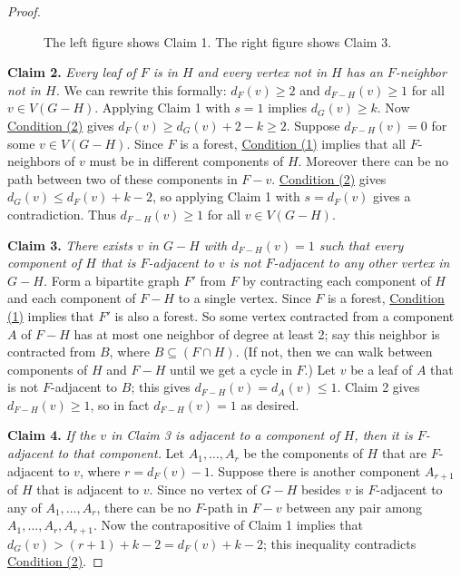 \documentclass[12pt]{article}
\theoremstyle{plain}
\theoremstyle{definition}
\theoremstyle{remark}
\newcommand{\CondOne}{\hyperref[cond1]{Condition (1)}}
\newcommand{\CondTwo}{\hyperref[cond2]{Condition (2)}}
\begin{document}
\begin{proof}
\begin{center}
\begin{figure}

\caption{The left figure shows Claim 1. The right figure 
shows Claim 3.
}
\label{lemma7-figs}
\end{figure}
\end{center}

\textbf{Claim 2.} \textit{Every leaf of $F$ is in $H$ and every vertex not in
$H$ has an $F$-neighbor not in $H$.}
We can rewrite this formally: $d_F(v) \ge 2$ and $d_{F-H}(v) \ge 1$ for all $v
\in V(G-H)$.
Applying Claim 1 with $s=1$ implies $d_G(v) \ge k$. 
Now {\CondTwo} gives $d_F(v) \ge d_G(v) + 2 - k \ge 2$. Suppose
$d_{F-H}(v) = 0$ for some $v \in V(G-H)$.   Since $F$ is a forest, {\CondOne} 
implies that all $F$-neighbors of $v$ must be in different components of $H$.
Moreover there can be no path between two of these components in $F-v$.  
{\CondTwo} gives $d_G(v)\le d_F(v)+k-2$, so
applying Claim 1 with $s = d_F(v)$ gives a contradiction.
Thus $d_{F-H}(v) \ge 1$ for all $v\in V(G-H)$.

\textbf{Claim 3.} 
\textit{There exists $v$ in $G-H$ with $d_{F-H}(v) = 1$ such that every
component of $H$ that is $F$-adjacent to $v$ is not $F$-adjacent to any other
vertex in $G-H$.}
Form a bipartite graph $F'$ from $F$ by contracting each component of $H$ and
each component of $F-H$ to a single vertex.  Since $F$ is a forest, {\CondOne}
implies that $F'$ is also a forest.  So some vertex contracted from a component
$A$ of $F-H$ has at most one neighbor of degree at least 2; say this neighbor
is contracted from $B$, where $B\subseteq (F\cap H)$.  (If not, then we can
walk between components of $H$ and $F-H$ until we get a cycle in $F$.)
Let $v$ be a leaf of $A$ that is not $F$-adjacent to $B$; this gives
$d_{F-H}(v) = d_{A}(v)\le 1$.  Claim 2 gives $d_{F-H}(v)\ge 1$, so in fact
$d_{F-H}(v)=1$ as desired.

\textbf{Claim 4.} \textit{If the $v$ in Claim 3 is adjacent to a component of
$H$, then it is $F$-adjacent to that component.}
Let $A_1, \ldots, A_r$ be the components of $H$ that are $F$-adjacent to $v$,
where $r = d_F(v) - 1$.  Suppose there is another component $A_{r+1}$ of $H$
that is adjacent to $v$.  Since no vertex of $G-H$ besides $v$ is $F$-adjacent
to any of $A_1, \ldots, A_r$, there can be no $F$-path in $F-v$ between any
pair among $A_1, \ldots, A_r, A_{r+1}$.  Now the contrapositive of Claim 1
implies that $d_G(v) > (r + 1) + k - 2 = d_F(v) + k - 2$; this inequality
contradicts {\CondTwo}.


\end{proof}
\end{document}
